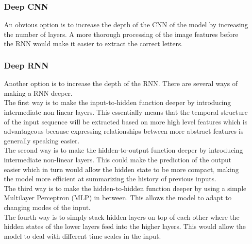\documentclass{article}
\begin{document}
\subsubsection{Deep CNN}
An obvious option is to increase the depth of the CNN of the model by increasing the number of layers. A more thorough processing of the image features before the RNN would make it easier to extract the correct letters.
\subsubsection{Deep RNN}
Another option is to increase the depth of the RNN. There are several ways of making a RNN deeper\cite{Pascanu2}.\\
The first way is to make the input-to-hidden function deeper by introducing intermediate non-linear layers. This essentially means that the temporal structure of the input sequence will be extracted based on more high level features which is advantageous because expressing relationships between more abstract features is generally speaking easier\cite{Mikolov}.\\
The second way is to make the hidden-to-output function deeper by introducing intermediate non-linear layers. This could make the prediction of the output easier which in turn would allow the hidden state to be more compact, making the model more efficient at summarizing the history of previous inputs.\\
The third way is to make the hidden-to-hidden function deeper by using a simple Multilayer Perceptron (MLP) in between. This allows the model to adapt to changing modes of the input.\\
The fourth way is to simply stack hidden layers on top of each other where the hidden states of the lower layers feed into the higher layers. This would allow the model to deal with different time scales in the input.
\end{document}
